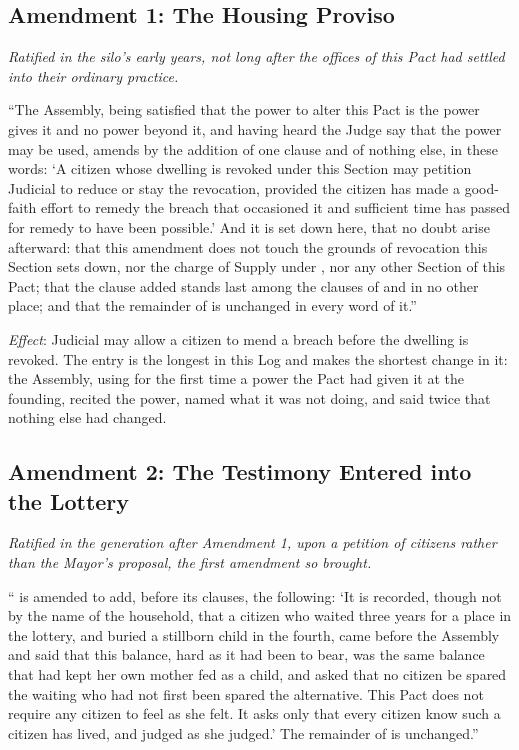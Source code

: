 \subsection*{Amendment 1: The Housing Proviso}

\textit{Ratified in the silo's early years, not long after the offices of this Pact had settled into their ordinary practice.}

``The Assembly, being satisfied that the power to alter this Pact is the power  gives it and no power beyond it, and having heard the Judge say that the power may be used, amends  by the addition of one clause and of nothing else, in these words: `A citizen whose dwelling is revoked under this Section may petition Judicial to reduce or stay the revocation, provided the citizen has made a good-faith effort to remedy the breach that occasioned it and sufficient time has passed for remedy to have been possible.' And it is set down here, that no doubt arise afterward: that this amendment does not touch the grounds of revocation this Section sets down, nor the charge of Supply under , nor any other Section of this Pact; that the clause added stands last among the clauses of  and in no other place; and that the remainder of  is unchanged in every word of it.''

\textit{Effect}: Judicial may allow a citizen to mend a breach before the dwelling is revoked. The entry is the longest in this Log and makes the shortest change in it: the Assembly, using for the first time a power the Pact had given it at the founding, recited the power, named what it was not doing, and said twice that nothing else had changed.

\subsection*{Amendment 2: The Testimony Entered into the Lottery}

\textit{Ratified in the generation after Amendment 1, upon a petition of citizens rather than the Mayor's proposal, the first amendment so brought.}

`` is amended to add, before its clauses, the following: `It is recorded, though not by the name of the household, that a citizen who waited three years for a place in the lottery, and buried a stillborn child in the fourth, came before the Assembly and said that this balance, hard as it had been to bear, was the same balance that had kept her own mother fed as a child, and asked that no citizen be spared the waiting who had not first been spared the alternative. This Pact does not require any citizen to feel as she felt. It asks only that every citizen know such a citizen has lived, and judged as she judged.' The remainder of  is unchanged.''

